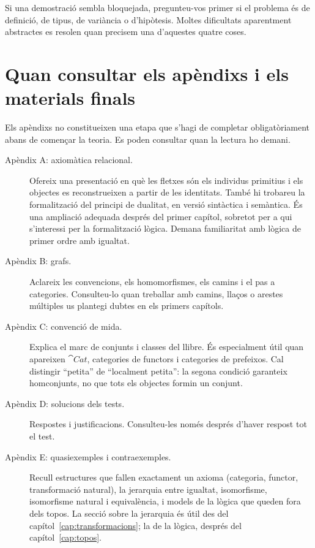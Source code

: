 Si una demostració sembla bloquejada, pregunteu-vos primer
si el problema és de definició, de tipus, de variància o
d'hipòtesis. Moltes dificultats aparentment abstractes
es resolen quan precisem una d'aquestes quatre coses.

\section{Quan consultar els apèndixs i els materials finals}

Els apèndixs no constitueixen una etapa que s'hagi de
completar obligatòriament abans de començar la teoria.
Es poden consultar quan la lectura ho demani.

\begin{description}
  \item[Apèndix A: axiomàtica relacional.]
        Ofereix una presentació en què les fletxes són
        els individus primitius i els objectes es
        reconstrueixen a partir de les identitats.
        També hi trobareu la formalització del principi
        de dualitat, en versió sintàctica i semàntica.
        És una ampliació adequada després del primer
        capítol, sobretot per a qui s'interessi per
        la formalització lògica. Demana familiaritat
        amb lògica de primer ordre amb igualtat.
  \item[Apèndix B: grafs.]
        Aclareix les convencions, els homomorfismes,
        els camins i el pas a categories. Consulteu-lo
        quan treballar amb camins, llaços o arestes
        múltiples us plantegi dubtes en els primers
        capítols.
  \item[Apèndix C: convenció de mida.]
        Explica el marc de conjunts i classes del llibre.
        És especialment útil quan apareixen
        $\cat{Cat}$, categories de functors i
        categories de prefeixos. Cal distingir
        \enquote{petita} de \enquote{localment petita}: la segona
        condició garanteix homconjunts, no que tots
        els objectes formin un conjunt.
  \item[Apèndix D: solucions dels tests.]
        Respostes i justificacions. Consulteu-les només
        després d'haver respost tot el test.
\ifpublicacioparcial\else
  \item[Apèndix E: quasiexemples i contraexemples.]
        Recull estructures que fallen exactament un axioma
        (categoria, functor, transformació natural), la
        jerarquia entre igualtat, isomorfisme, isomorfisme
        natural i equivalència, i models de la lògica que
        queden fora dels topos. La secció sobre la
        jerarquia és útil des del capítol~\ref{cap:transformacions};
        la de la lògica, després del capítol~\ref{cap:topos}.
\fi
\end{description}

